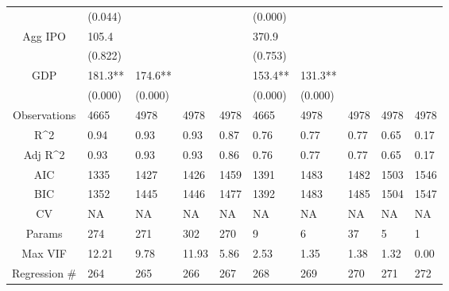 \documentclass{article}
\begin{document}
\begin{table}[H]
\begin{tabular}{|clllllllll|}
   & (0.044) &  &  &  & (0.000) &  &  &  &  \\ 
  Agg IPO & 105.4 &  &  &  & 370.9 &  &  &  &  \\ 
   & (0.822) &  &  &  & (0.753) &  &  &  &  \\ 
  GDP & 181.3** & 174.6** &  &  & 153.4** & 131.3** &  &  &  \\ 
   & (0.000) & (0.000) &  &  & (0.000) & (0.000) &  &  &  \\ 
  \hline 
 Observations & 4665 & 4978 & 4978 & 4978 & 4665 & 4978 & 4978 & 4978 & 4978 \\ 
  R^2 & 0.94 & 0.93 & 0.93 & 0.87 & 0.76 & 0.77 & 0.77 & 0.65 & 0.17 \\ 
  Adj R^2 & 0.93 & 0.93 & 0.93 & 0.86 & 0.76 & 0.77 & 0.77 & 0.65 & 0.17 \\ 
  AIC & 1335 & 1427 & 1426 & 1459 & 1391 & 1483 & 1482 & 1503 & 1546 \\ 
  BIC & 1352 & 1445 & 1446 & 1477 & 1392 & 1483 & 1485 & 1504 & 1547 \\ 
  CV & NA & NA & NA & NA & NA & NA & NA & NA & NA \\ 
  Params & 274 & 271 & 302 & 270 & 9 & 6 & 37 & 5 & 1 \\ 
  Max VIF & 12.21 & 9.78 & 11.93 & 5.86 & 2.53 & 1.35 & 1.38 & 1.32 & 0.00 \\ 
  Regression \# & 264 & 265 & 266 & 267 & 268 & 269 & 270 & 271 & 272 \\ 
   \hline
\end{tabular}
 
\end{table}
\end{document}

